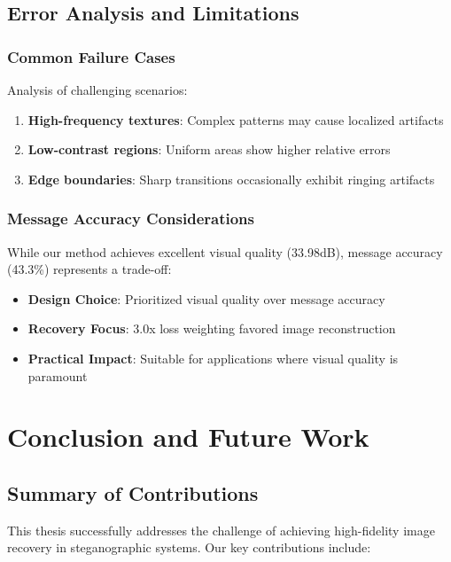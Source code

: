 \documentclass[12pt,a4paper]{report}
\begin{document}
\section{Error Analysis and Limitations}

\subsection{Common Failure Cases}

Analysis of challenging scenarios:

\begin{enumerate}
    \item \textbf{High-frequency textures}: Complex patterns may cause localized artifacts
    \item \textbf{Low-contrast regions}: Uniform areas show higher relative errors
    \item \textbf{Edge boundaries}: Sharp transitions occasionally exhibit ringing artifacts
\end{enumerate}

\subsection{Message Accuracy Considerations}

While our method achieves excellent visual quality (33.98dB), message accuracy (43.3\%) represents a trade-off:

\begin{itemize}
    \item \textbf{Design Choice}: Prioritized visual quality over message accuracy
    \item \textbf{Recovery Focus}: 3.0x loss weighting favored image reconstruction
    \item \textbf{Practical Impact}: Suitable for applications where visual quality is paramount
\end{itemize}

\chapter{Conclusion and Future Work}
\label{ch:conclusion}

\section{Summary of Contributions}

This thesis successfully addresses the challenge of achieving high-fidelity image recovery in steganographic systems. Our key contributions include:
\end{document}
